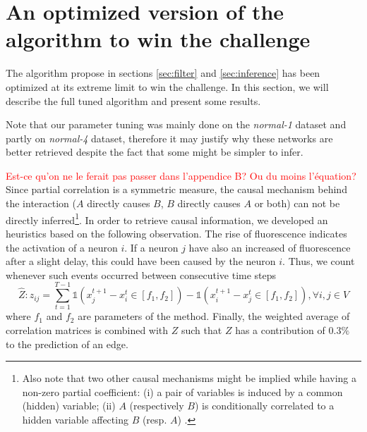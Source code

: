 \documentclass[wcp]{jmlr}
\begin{document}
\newpage
\clearpage



\newpage
\clearpage

\appendix


\section{An optimized version of the algorithm to win the challenge}
\label{app:optimized}


The algorithm propose in sections \ref{sec:filter} and \ref{sec:inference} has been optimized at its extreme limit to win the challenge. In this section, we will describe the full tuned algorithm and present some results.

Note that our parameter tuning was mainly
done on the \textit{normal-1} dataset and partly on \textit{normal-4} dataset,
therefore it may justify why these networks are better retrieved despite the
fact that some might be simpler to infer.

\textcolor{red}{Est-ce qu'on ne le ferait pas passer dans l'appendice B? Ou du moins l'équation?}
Since partial correlation is a symmetric measure, the causal mechanism behind the
interaction ($A$ directly causes $B$, $B$ directly causes $A$ or both) can not
be directly inferred\footnote{Also note that two other causal mechanisms might be
implied while having a non-zero partial coefficient: (i) a pair of variables
is induced by a common (hidden) variable; (ii) $A$ (respectively $B$) is
conditionally correlated to a hidden variable affecting $B$ (resp. $A$)
\citep{de2004discovery}.}.
In order to retrieve causal information, we developed an
heuristics based on the following observation. The rise of fluorescence
indicates the activation of a neuron $i$. If a neuron $j$ have also
an increased of fluorescence after a slight delay, this could have been
caused by the neuron $i$. Thus, we count whenever
such events occurred between consecutive time steps
\[
\hat{Z}: z_{ij} = \sum_{t=1}^{T - 1}
    \mathbb{1}(x_j^{t+1} - x_i^t \in \left[f_1, f_2 \right]) -
    \mathbb{1}(x_i^{t+1} - x_j^t \in \left[f_1, f_2 \right]), \forall i, j \in V
\]
where $f_1$ and $f_2$ are parameters of the method.
Finally, the weighted average of correlation matrices is combined with $Z$ such
that $Z$ has a contribution of $0.3\%$ to the prediction of an edge.
\end{document}
